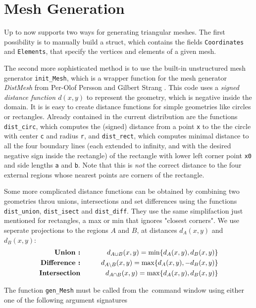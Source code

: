 \section{Mesh Generation}
\label{sect:MGEN}

Up to now \LIBNAME supports two ways for generating triangular meshes. The first possibility is to manually build a
\MATLAB struct, which contains the fields {\tt Coordinates} and {\tt Elements}, that specify the vertices
and elements of a given mesh.

The second more sophisticated method is to use the built-in unstructured mesh generator {\tt init\_Mesh}, which
is a wrapper function for the mesh generator {\em DistMesh} from Per-Olof Persson and Gilbert Strang \cite{PER04}.
This code uses a {\em signed distance function $d(x,y)$} to represent the geometry, which is negative inside the
domain. It is is easy to create distance functions for simple geometries like circles or rectangles. Already contained
in the current distribution are the functions {\tt dist\_circ}, which computes the (signed) distance from a point {\tt x}
to the the circle with center {\tt c} and radius {\tt r}, and {\tt dist\_rect}, which computes minimal distance to all
the four boundary lines (each extended to infinity, and with the desired negative sign inside the rectangle) of the
rectangle with lower left corner point {\tt x0} and side lengths {\tt a} and {\tt b}. Note that this is {\em not}
the correct distance to the four external regions whose nearest points are corners of the rectangle.

Some more complicated distance functions can be obtained by combining two geometries throu unions, intersections
and set differences using the functions {\tt dist\_union}, {\tt dist\_isect} and {\tt dist\_diff}. They use the same
simplifaction just mentioned for rectangles, a max or min that ignores "closest corners". We use seperate projections
to the regions $A$ and $B$, at distances $d_A(x,y)$ and $d_B(x,y)$:
\begin{eqnarray}
  \text{{\bf Union :}}      & \qquad & d_{A\cup B}(x,y) = \min\{d_A(x,y),d_B(x,y)\} \\
  \text{{\bf Difference :}} & \qquad & d_{A\setminus B}(x,y) = \max\{d_A(x,y),-d_B(x,y)\}\\
  \text{{\bf Intersection}} & \qquad & d_{A\cap B}(x,y) = \max\{d_A(x,y),d_B(x,y)\}
\end{eqnarray}

The function {\tt gen\_Mesh} must be called from the \MATLAB\,command window using either one of the following argument
signatures \\

